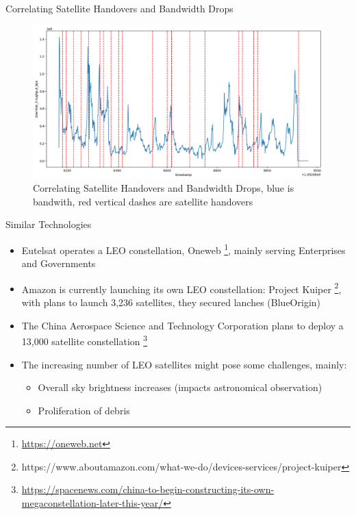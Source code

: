 \documentclass[NET,english,beameralt]{tumbeamer}
\begin{document}
\begin{frame}[fragile]{Correlating Satellite Handovers and Bandwidth Drops}
    \begin{figure}
        \includegraphics[width=0.8\columnwidth]{pics/correlation_handovers_bw.png}
        \caption{Correlating Satellite Handovers and Bandwidth Drops, blue is bandwith, red vertical dashes are satellite handovers}
    \end{figure}
\end{frame}

\begin{frame}{Similar Technologies}
    \begin{itemize}
        \item Eutelsat operates a LEO constellation, Oneweb \footnote{\url{https://oneweb.net}}, mainly serving Enterprises and Governments
        \item Amazon is currently launching its own LEO constellation: Project Kuiper \footnote{https://www.aboutamazon.com/what-we-do/devices-services/project-kuiper}, with plans to launch 3,236 satellites, they secured lanches (BlueOrigin)
        \item The China Aerospace Science and Technology Corporation plans to deploy a 13,000 satellite constellation
                \footnote{\url{https://spacenews.com/china-to-begin-constructing-its-own-megaconstellation-later-this-year/}}
        \item The increasing number of LEO satellites might pose some challenges, mainly:
        \begin{itemize}
            \item Overall sky brightness increases (impacts astronomical observation)
            \item Proliferation of debris
        \end{itemize}

    \end{itemize}
\end{frame}
\end{document}
